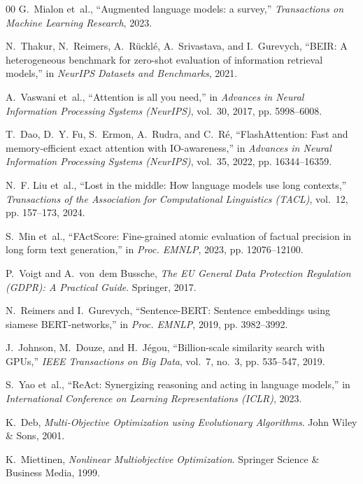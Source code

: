 \documentclass[journal,10pt,twocolumn]{IEEEtran}
\begin{document}
\begin{thebibliography}{00}
G.~Mialon et~al., ``Augmented language models: a survey,'' \textit{Transactions on Machine Learning Research}, 2023.

N.~Thakur, N.~Reimers, A.~R{\"u}ckl{\'e}, A.~Srivastava, and I.~Gurevych, ``{BEIR}: A heterogeneous benchmark for zero-shot evaluation of information retrieval models,'' in \textit{NeurIPS Datasets and Benchmarks}, 2021.

A.~Vaswani et~al., ``Attention is all you need,'' in \textit{Advances in Neural Information Processing Systems (NeurIPS)}, vol.~30, 2017, pp. 5998--6008.

T.~Dao, D.~Y. Fu, S.~Ermon, A.~Rudra, and C.~R{\'e}, ``{FlashAttention}: Fast and memory-efficient exact attention with {IO}-awareness,'' in \textit{Advances in Neural Information Processing Systems (NeurIPS)}, vol.~35, 2022, pp. 16344--16359.

N.~F. Liu et~al., ``Lost in the middle: How language models use long contexts,'' \textit{Transactions of the Association for Computational Linguistics (TACL)}, vol.~12, pp. 157--173, 2024.

S.~Min et~al., ``{FActScore}: Fine-grained atomic evaluation of factual precision in long form text generation,'' in \textit{Proc. EMNLP}, 2023, pp. 12076--12100.

P.~Voigt and A.~von~dem Bussche, \textit{The {EU} General Data Protection Regulation ({GDPR}): A Practical Guide}. Springer, 2017.

N.~Reimers and I.~Gurevych, ``Sentence-{BERT}: Sentence embeddings using siamese {BERT}-networks,'' in \textit{Proc. EMNLP}, 2019, pp. 3982--3992.

J.~Johnson, M.~Douze, and H.~J{\'e}gou, ``Billion-scale similarity search with {GPUs},'' \textit{IEEE Transactions on Big Data}, vol.~7, no.~3, pp. 535--547, 2019.

S.~Yao et~al., ``{ReAct}: Synergizing reasoning and acting in language models,'' in \textit{International Conference on Learning Representations (ICLR)}, 2023.

K.~Deb, \textit{Multi-Objective Optimization using Evolutionary Algorithms}. John Wiley \& Sons, 2001.

K.~Miettinen, \textit{Nonlinear Multiobjective Optimization}. Springer Science \& Business Media, 1999.


\end{thebibliography}
\end{document}
